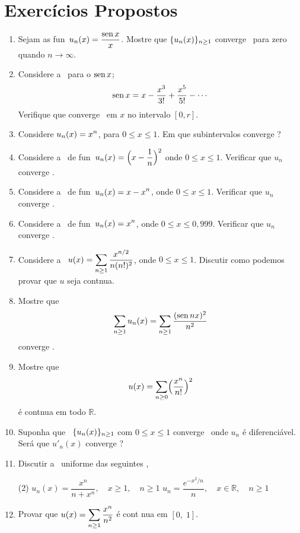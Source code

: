 \section*{Exercícios Propostos}
\begin{enumerate}[label=(\arabic*)]
\item Sejam as fun\coes\ $\displaystyle{u_n(x)=\frac{\operatorname{sen}x}{x}}$. Mostre
  que $\displaystyle{\{u_n(x)\}_{n\geq1}}$ converge \unif\ para zero quando
  $n\to\infty$.
\item Considere a \ser\ para o $\operatorname{sen} x$;
  $$
\operatorname{sen} x= x-\frac{x^3}{3!}+\frac{x^5}{5!}-\cdots
  $$
Verifique que converge \unif\ em $x$ no intervalo $[0,r]$.
\item Considere $\displaystyle{u_n(x)=x^n}$, para $0\leq x\leq 1$. Em que
subintervalos converge \unif ?
\item Considere a \seq\ de fun\coes\
$\displaystyle{u_n(x)=\Bigl(x-\frac{1}{n}\Bigr)^2}$ onde $0\leq x \leq 1$.
Verificar que $u_n$ converge \unif .
\item Considere a \seq\ de fun\coes\
$\displaystyle{u_n(x)=x-x^{n}}$, onde $0\leq x \leq 1$. Verificar que $u_n$
converge \unif .
\item Considere a \seq\ de fun\coes\
$\displaystyle{u_n(x)=x^{n}}$, onde $0\leq x \leq 0,999$. Verificar que
$u_n$ converge \unif .
\item Considere a \ser\ $\displaystyle{u(x)=\sum_{n\geq 1}\frac{x^{n/2}}{n(n!)^2}}$, onde
$0\leq x \leq 1$. Discutir como podemos provar que $u$ seja
cont\ii nua.
\item Mostre que
  $$
\sum_{n\geq 1}u_n(x)=\sum_{n\geq 1}\frac{(\operatorname{sen} nx)^2}{n^2}
  $$
converge \unif .

\item Mostre que
  $$
u(x)=\sum_{n\geq 0}\Bigl(\frac{x^n}{n!}\Bigr)^2
  $$
\'e cont\ii nua em todo $\mathbb{R}$.
\item Suponha que \seq\ $\displaystyle{\{u_n(x)\}_{n\geq 1}}$ com $0\leq
x\leq 1$ converge \unif\ onde $u_n$ \'e diferenci\'avel. Ser\'a que
$u'_n(x)$ converge \unif ?

\item Discutir a \conv\ uniforme das seguintes \seqs ,
\begin{tasks}[label=(\alph*),label-width=4ex,item-indent=2em,ref=(\alph*)](2)
\task  \(\displaystyle{u_n(x)=\dfrac{x^n}{n+x^n}},\quad x\geq 1,\quad n\geq 1 \)
\task \(\displaystyle{u_{n}=\dfrac{e^{-x^2/n}}{n}},\quad x\in \mathbb{R},\quad n\geq 1\)
\end{tasks}

\item Provar que $\displaystyle{u(x)=\sum_{n\geq 1}\frac{x^n}{n^2}}$ \'e cont\ii
nua em $[0,\; 1]$.


\end{enumerate}
